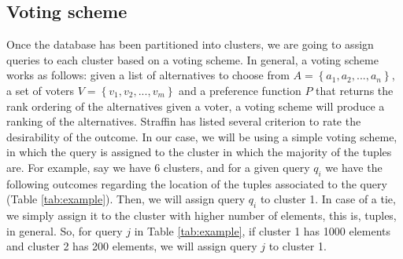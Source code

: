 \documentclass[sigconf]{acmart}
\begin{document}
\subsection{Voting scheme} 
Once the database has been partitioned into clusters, we are going to assign queries to each cluster based on a voting scheme. In general, a voting scheme works as follows: given a list of alternatives to choose from $A = \left\lbrace a_1,a_2,...,a_n \right\rbrace$, a set of voters $V = \left\lbrace v_1,v_2,...,v_m \right\rbrace$ and a preference function $P$ that returns the rank ordering of the alternatives given a voter, a voting scheme will produce a ranking of the alternatives. Straffin \cite{Roush1982TopicsIT} has listed several criterion to rate the desirability of the outcome. In our case, we will be using a simple voting scheme, in which the query is assigned to the cluster in which the majority of the tuples are. For example, say we have 6 clusters, and for a given query $q_i$ we have the following outcomes regarding the location of the tuples associated to the query (Table \ref{tab:example}). Then, we will assign query $q_i$ to cluster 1. In case of a tie, we simply assign it to the cluster with higher number of elements, this is, tuples, in general. So, for query $j$ in Table \ref{tab:example}, if cluster 1 has 1000 elements and cluster 2 has 200 elements, we will assign query $j$ to cluster 1.
\begin{table}[H]
    \centering
    \caption{Example of query assignation}
    \label{tab:example}
\end{table}
\begin{comment}
In our case, we will be using the Borda count voting rule, in which points are given to each choice based on ranking. Hence, the last place of the alternative gets 1 point, the second to last gets 2 points, and so on until the first place, which gets $n$ points. If a voter is indifferent to 2 or more alternatives, then each one is assigned the average of the alternatives. For example, suppose a voter has the preference list given by $P = \left\lbrace a, ( b,c,d), e, f \right\rbrace$, then f will get 1 point, e gets 2 points, d, c and b get 4 points (average of 3, 4, 5) and a gets 6 points.  
\end{comment}
\end{document}
